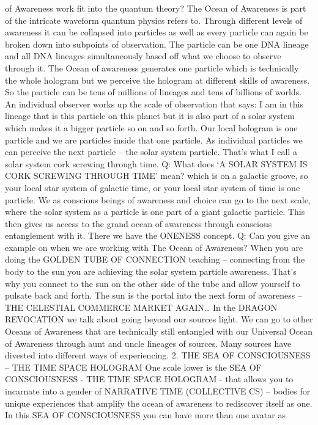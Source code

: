 of Awareness work fit into the quantum theory? The Ocean of Awareness is
part of the intricate waveform quantum physics refers to. Through
different levels of awareness it can be collapsed into particles as well
as every particle can again be broken down into subpoints of
observation. The particle can be one DNA lineage and all DNA lineages
simultaneously based off what we choose to observe through it. The Ocean
of awareness generates one particle which is technically the whole
hologram but we perceive the hologram at different skills of awareness.
So the particle can be tens of millions of lineages and tens of billions
of worlds. An individual observer works up the scale of observation that
says: I am in this lineage that is this particle on this planet but it
is also part of a solar system which makes it a bigger particle so on
and so forth. Our local hologram is one particle and we are particles
inside that one particle. As individual particles we can perceive the
next particle -- the solar system particle. That's what I call a solar
system cork screwing through time. Q: What does `A SOLAR SYSTEM IS CORK
SCREWING THROUGH TIME' mean? which is on a galactic groove, so your
local star system of galactic time, or your local star system of time is
one particle. We as conscious beings of awareness and choice can go to
the next scale, where the solar system as a particle is one part of a
giant galactic particle. This then gives us access to the grand ocean of
awareness through conscious entanglement with it. There we have the
ONENESS concept. Q: Can you give an example on when we are working with
The Ocean of Awareness? When you are doing the GOLDEN TUBE OF CONNECTION
teaching -- connecting from the body to the sun you are achieving the
solar system particle awareness. That's why you connect to the sun on
the other side of the tube and allow yourself to pulsate back and forth.
The sun is the portal into the next form of awareness -- THE CELESTIAL
COMMERCE MARKET AGAIN\ldots{} In the DRAGON REVOCATION we talk about
going beyond our sources light. We can go to other Oceans of Awareness
that are technically still entangled with our Universal Ocean of
Awareness through aunt and uncle lineages of sources. Many sources have
divested into different ways of experiencing. 2. THE SEA OF
CONSCIOUSNESS -- THE TIME SPACE HOLOGRAM One scale lower is the SEA OF
CONSCIOUSNESS - THE TIME SPACE HOLOGRAM - that allows you to incarnate
into a gender of NARRATIVE TIME (COLLECTIVE CS) -- bodies for unique
experiences that amplify the ocean of awareness to rediscover itself as
one. In this SEA OF CONSCIOUSNESS you can have more than one avatar as
